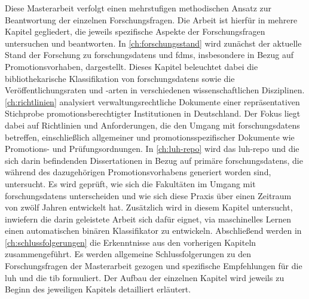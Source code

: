 Diese Masterarbeit verfolgt einen mehrstufigen methodischen Ansatz zur Beantwortung der einzelnen Forschungsfragen.
Die Arbeit ist hierfür in mehrere Kapitel gegliedert, die jeweils spezifische Aspekte der Forschungsfragen untersuchen und beantworten.
%
In \cref{ch:forschungsstand} wird zunächst der aktuelle Stand der Forschung zu \glspl{forschungsdaten} und \glspl{fdm}, insbesondere in Bezug auf Promotionsvorhaben, dargestellt.
Dieses Kapitel beleuchtet dabei die bibliothekarische Klassifikation von \glspl{forschungsdaten} sowie die Veröffentlichungsraten und -arten in verschiedenen wissenschaftlichen Disziplinen.
%
\cref{ch:richtlinien} analysiert verwaltungsrechtliche Dokumente einer repräsentativen Stichprobe promotionsberechtigter Institutionen in Deutschland.
Der Fokus liegt dabei auf Richtlinien und Anforderungen, die den Umgang mit \glspl{forschungsdaten} betreffen, einschließlich allgemeiner und promotionsspezifischer Dokumente wie Promotions- und Prüfungsordnungen.
%
In \cref{ch:luh-repo} wird das \gls{luh-repo} und die sich darin befindenden Dissertationen in Bezug auf primäre \glspl{forschungsdaten}, die während des dazugehörigen Promotionsvorhabens generiert worden sind, untersucht.
Es wird geprüft, wie sich die Fakultäten im Umgang mit \glspl{forschungsdaten} unterscheiden und wie sich diese Praxis über einen Zeitraum von zwölf Jahren entwickelt hat.
Zusätzlich wird in diesem Kapitel untersucht, inwiefern die darin geleistete Arbeit sich dafür eignet, via maschinelles Lernen einen automatischen binären Klassifikator zu entwickeln.
%
Abschließend werden in \cref{ch:schlussfolgerungen} die Erkenntnisse aus den vorherigen Kapiteln zusammengeführt.
Es werden allgemeine Schlussfolgerungen zu den Forschungsfragen der Masterarbeit gezogen und spezifische Empfehlungen für die \gls{luh} und die \gls{tib} formuliert.
%
Der Aufbau der einzelnen Kapitel wird jeweils zu Beginn des jeweiligen Kapitels detailliert erläutert.
